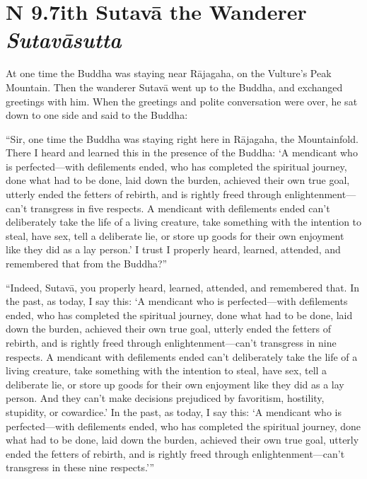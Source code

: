 \documentclass[12pt,openany]{book}%
\newcommand*{\suttatitleacronym}[1]{\smaller[2]{#1}\vspace*{.3em}}
\newcommand*{\suttatitletranslation}[1]{\linebreak{#1}}
\newcommand*{\suttatitleroot}[1]{\linebreak\smaller[2]\itshape{#1}}
\newcommand*{\tocacronym}[1]{\hspace*{-3.3em}{#1}\quad}
\newcommand*{\toctranslation}[1]{#1}
\newcommand*{\tocroot}[1]{(\textit{#1})}
\begin{document}
%
\section*{{\suttatitleacronym AN 9.7}{\suttatitletranslation With Sutavā the Wanderer }{\suttatitleroot Sutavāsutta}}
\addcontentsline{toc}{section}{\tocacronym{AN 9.7} \toctranslation{With Sutavā the Wanderer } \tocroot{Sutavāsutta}}

At one time the Buddha was staying near \textsanskrit{Rājagaha}, on the Vulture’s Peak Mountain. Then the wanderer \textsanskrit{Sutavā} went up to the Buddha, and exchanged greetings with him. When the greetings and polite conversation were over, he sat down to one side and said to the Buddha: 

“Sir, one time the Buddha was staying right here in \textsanskrit{Rājagaha}, the Mountainfold. There I heard and learned this in the presence of the Buddha: ‘A mendicant who is perfected—with defilements ended, who has completed the spiritual journey, done what had to be done, laid down the burden, achieved their own true goal, utterly ended the fetters of rebirth, and is rightly freed through enlightenment—can’t transgress in five respects. A mendicant with defilements ended can’t deliberately take the life of a living creature, take something with the intention to steal, have sex, tell a deliberate lie, or store up goods for their own enjoyment like they did as a lay person.’ I trust I properly heard, learned, attended, and remembered that from the Buddha?” 

“Indeed, \textsanskrit{Sutavā}, you properly heard, learned, attended, and remembered that. In the past, as today, I say this: ‘A mendicant who is perfected—with defilements ended, who has completed the spiritual journey, done what had to be done, laid down the burden, achieved their own true goal, utterly ended the fetters of rebirth, and is rightly freed through enlightenment—can’t transgress in nine respects. A mendicant with defilements ended can’t deliberately take the life of a living creature, take something with the intention to steal, have sex, tell a deliberate lie, or store up goods for their own enjoyment like they did as a lay person. And they can’t make decisions prejudiced by favoritism, hostility, stupidity, or cowardice.’ In the past, as today, I say this: ‘A mendicant who is perfected—with defilements ended, who has completed the spiritual journey, done what had to be done, laid down the burden, achieved their own true goal, utterly ended the fetters of rebirth, and is rightly freed through enlightenment—can’t transgress in these nine respects.’” 
\end{document}
